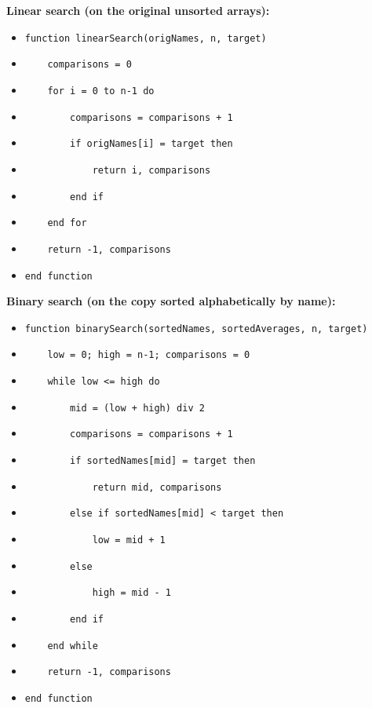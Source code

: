 \documentclass[11pt]{article}
\begin{document}
\begin{exemplebox}
\textbf{Linear search (on the original unsorted arrays):}
\begin{itemize}
    \item \texttt{function linearSearch(origNames, n, target)}
    \item \texttt{~~~~comparisons = 0}
    \item \texttt{~~~~for i = 0 to n-1 do}
    \item \texttt{~~~~~~~~comparisons = comparisons + 1}
    \item \texttt{~~~~~~~~if origNames[i] = target then}
    \item \texttt{~~~~~~~~~~~~return i, comparisons}
    \item \texttt{~~~~~~~~end if}
    \item \texttt{~~~~end for}
    \item \texttt{~~~~return -1, comparisons}
    \item \texttt{end function}
\end{itemize}

\textbf{Binary search (on the copy sorted alphabetically by name):}
\begin{itemize}
    \item \texttt{function binarySearch(sortedNames, sortedAverages, n, target)}
    \item \texttt{~~~~low = 0; high = n-1; comparisons = 0}
    \item \texttt{~~~~while low <= high do}
    \item \texttt{~~~~~~~~mid = (low + high) div 2}
    \item \texttt{~~~~~~~~comparisons = comparisons + 1}
    \item \texttt{~~~~~~~~if sortedNames[mid] = target then}
    \item \texttt{~~~~~~~~~~~~return mid, comparisons}
    \item \texttt{~~~~~~~~else if sortedNames[mid] < target then}
    \item \texttt{~~~~~~~~~~~~low = mid + 1}
    \item \texttt{~~~~~~~~else}
    \item \texttt{~~~~~~~~~~~~high = mid - 1}
    \item \texttt{~~~~~~~~end if}
    \item \texttt{~~~~end while}
    \item \texttt{~~~~return -1, comparisons}
    \item \texttt{end function}
\end{itemize}


\end{exemplebox}
\end{document}
